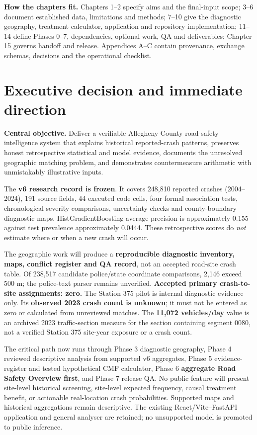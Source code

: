 \documentclass[11pt,a4paper,openany]{report}
\begin{document}
\textbf{How the chapters fit.} Chapters 1--2 specify aims and the final-input scope; 3--6 document established data, limitations and methods; 7--10 give the diagnostic geography, treatment calculator, application and repository implementation; 11--14 define Phases 0--7, dependencies, optional work, QA and deliverables; Chapter 15 governs handoff and release. Appendices A--C contain provenance, exchange schemas, decisions and the operational checklist.

\chapter*{Executive decision and immediate direction}
\textbf{Central objective.} Deliver a verifiable Allegheny County road-safety intelligence system that explains historical reported-crash patterns, preserves honest retrospective statistical and model evidence, documents the unresolved geographic matching problem, and demonstrates countermeasure arithmetic with unmistakably illustrative inputs.

The \textbf{v6 research record is frozen}. It covers 248,810 reported crashes (2004--2024), 191 source fields, 44 executed code cells, four formal association tests, chronological severity comparisons, uncertainty checks and county-boundary diagnostic maps. HistGradientBoosting average precision is approximately 0.155 against test prevalence approximately 0.0444. These retrospective scores do \emph{not} estimate where or when a new crash will occur.

The geographic work will produce a \textbf{reproducible diagnostic inventory, maps, conflict register and QA record}, not an accepted road-site crash table. Of 238,517 candidate police/state coordinate comparisons, 2,146 exceed 500 m; the police-text parser remains unverified. \textbf{Accepted primary crash-to-site assignments: zero.} The Station 375 pilot is internal diagnostic evidence only. Its \textbf{observed 2023 crash count is unknown}; it must not be entered as zero or calculated from unreviewed matches. The \textbf{11,072 vehicles/day} value is an archived 2023 traffic-section measure for the section containing segment 0080, not a verified Station 375 site-year exposure or a crash count.

The critical path now runs through Phase 3 diagnostic geography, Phase 4 reviewed descriptive analysis from supported v6 aggregates, Phase 5 evidence-register and tested hypothetical CMF calculator, Phase 6 \textbf{aggregate Road Safety Overview first}, and Phase 7 release QA. No public feature will present site-level historical screening, site-level expected frequency, causal treatment benefit, or actionable real-location crash probabilities. Supported maps and historical aggregations remain descriptive. The existing React/Vite--FastAPI application and general analyser are retained; no unsupported model is promoted to public inference.
\end{document}
